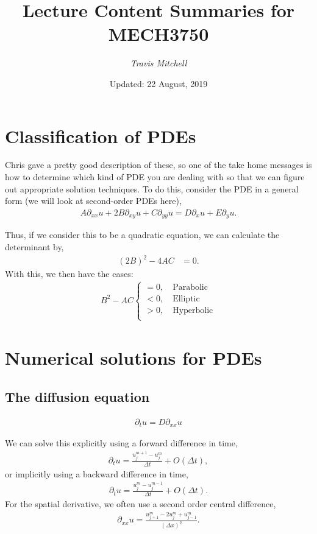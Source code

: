 \documentclass[11pt,a4paper]{report}
\author{\textit{Travis Mitchell}}
\title{Lecture Content Summaries for MECH3750}
\date{Updated: 22 August, 2019}
\theoremstyle{definition}
\begin{document}
\section{Classification of PDEs}
Chris gave a pretty good description of these, so one of the take home messages is how to determine which kind of PDE you are dealing with so that we can figure out appropriate solution techniques. To do this, consider the PDE in a general form (we will look at second-order PDEs here),
\begin{align*}
	A \partial_{xx} u + 2B \partial_{xy} u + C \partial_{yy} u = D\partial_x u + E \partial_y u.
\end{align*}

Thus, if we consider this to be a quadratic equation, we can calculate the determinant by,
\begin{align*}
	(2B)^2 - 4 AC &= 0.
\end{align*}
With this, we then have the cases:
\begin{align*}
B^2 - AC \begin{cases}
				= 0, \quad \text{Parabolic} \\
				< 0, \quad \text{Elliptic} \\
				> 0, \quad \text{Hyperbolic} \\
\end{cases}
\end{align*}

\section{Numerical solutions for PDEs}
\subsection{The diffusion equation}
\begin{align*}
	\partial_t u = D \partial_{xx} u
\end{align*}

We can solve this explicitly using a forward difference in time,
\begin{align*}
\partial_t u = \frac{u_j^{m+1} - u_j^m}{\Delta t} + O(\Delta t),
\end{align*}
or implicitly using a backward difference in time,
\begin{align*}
\partial_t u = \frac{u_j^{m} - u_j^{m-1}}{\Delta t} + O(\Delta t).
\end{align*}
For the spatial derivative, we often use a second order central difference,
\begin{align*}
\partial_{xx}u  = \frac{u_{j+1}^m - 2u_j^m + u_{j-1}^m}{(\Delta x)^2}.
\end{align*}
\end{document}
